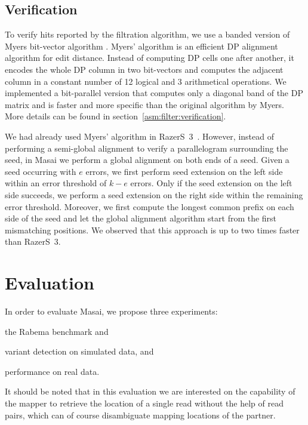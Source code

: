 \subsection{Verification}
\label{masai:engineering:extension}

To verify hits reported by the filtration algorithm, we use a banded version of Myers bit-vector algorithm \citep{Myers1999}.
Myers' algorithm is an efficient DP alignment algorithm \citep{Needleman1970} for edit distance. 
Instead of computing DP cells one after another, it encodes the whole DP column in two bit-vectors and computes the adjacent column in a constant number of 12 logical and 3 arithmetical operations.
We implemented a bit-parallel version that computes only a diagonal band of the DP matrix and is faster and more specific than the original algorithm by Myers.
More details can be found in section~\ref{asm:filter:verification}.

We had already used Myers' algorithm in RazerS~3~\citep{RazerS3}.
However, instead of performing a semi-global alignment to verify a parallelogram surrounding the seed, in Masai we perform a global alignment on both ends of a seed.
Given a seed occurring with $e$ errors, we first perform seed extension on the left side within an error threshold of $k - e$ errors.
Only if the seed extension on the left side succeeds, we perform a seed extension on the right side within the remaining error threshold.
Moreover, we first compute the longest common prefix on each side of the seed and let the global alignment algorithm start from the first mismatching positions.
We observed that this approach is up to two times faster than RazerS~3.


\section{Evaluation}

In order to evaluate Masai, we propose three experiments: \begin{inparaenum}[(i)]
\item the Rabema benchmark and
\item variant detection on simulated data, and
\item performance on real data.
\end{inparaenum}

It should be noted that in this evaluation we are interested on the capability of the mapper to retrieve the location of a single read without the help of read pairs, which can of course disambiguate mapping locations of the partner.

